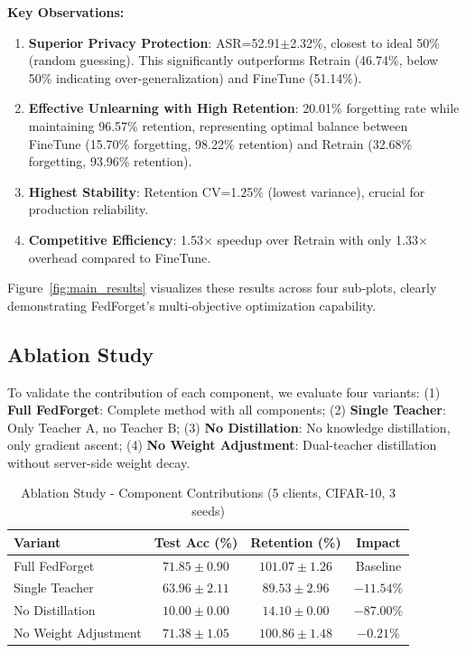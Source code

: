 \documentclass[10pt,twocolumn]{article}
\begin{document}
\textbf{Key Observations:}

\begin{enumerate}
\item \textbf{Superior Privacy Protection}: ASR=52.91$\pm$2.32\%, closest to ideal 50\% (random guessing). This significantly outperforms Retrain (46.74\%, below 50\% indicating over-generalization) and FineTune (51.14\%).
\item \textbf{Effective Unlearning with High Retention}: 20.01\% forgetting rate while maintaining 96.57\% retention, representing optimal balance between FineTune (15.70\% forgetting, 98.22\% retention) and Retrain (32.68\% forgetting, 93.96\% retention).
\item \textbf{Highest Stability}: Retention CV=1.25\% (lowest variance), crucial for production reliability.
\item \textbf{Competitive Efficiency}: 1.53$\times$ speedup over Retrain with only 1.33$\times$ overhead compared to FineTune.
\end{enumerate}

Figure~\ref{fig:main_results} visualizes these results across four sub-plots, clearly demonstrating FedForget's multi-objective optimization capability.

\subsection{Ablation Study}

To validate the contribution of each component, we evaluate four variants: (1) \textbf{Full FedForget}: Complete method with all components; (2) \textbf{Single Teacher}: Only Teacher A, no Teacher B; (3) \textbf{No Distillation}: No knowledge distillation, only gradient ascent; (4) \textbf{No Weight Adjustment}: Dual-teacher distillation without server-side weight decay.

\begin{table}[t]
\centering
\caption{Ablation Study - Component Contributions (5 clients, CIFAR-10, 3 seeds)}
\label{tab:ablation}
\begin{tabular}{lccc}
\toprule
Variant & Test Acc (\%) & Retention (\%) & Impact \\
\midrule
Full FedForget & $71.85 \pm 0.90$ & $101.07 \pm 1.26$ & Baseline \\
Single Teacher & $63.96 \pm 2.11$ & $89.53 \pm 2.96$ & $-11.54$\% \\
No Distillation & $10.00 \pm 0.00$ & $14.10 \pm 0.00$ & $-87.00$\% \\
No Weight Adjustment & $71.38 \pm 1.05$ & $100.86 \pm 1.48$ & $-0.21$\% \\
\bottomrule
\end{tabular}
\end{table}
\end{document}
